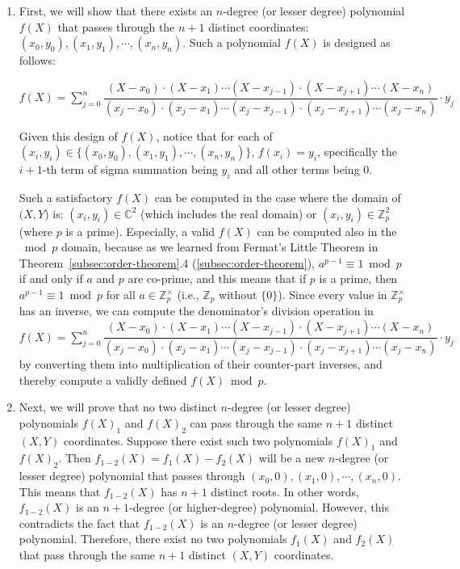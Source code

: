 \begin{myproof}
\begin{enumerate}


\item First, we will show that there exists an $n$-degree (or lesser degree) polynomial $f(X)$ that passes through the $n+1$ distinct coordinates: $(x_0, y_0), (x_1, y_1), \cdots, (x_n, y_n)$. Such a polynomial $f(X)$ is designed as follows:

$f(X) = \sum\limits_{j=0}^{n}\dfrac{(X-x_0)\cdot(X-x_1)\cdots(X-x_{j-1})\cdot(X-x_{j+1})\cdots(X-x_{n})}{(x_j-x_0)\cdot(x_j-x_1)\cdots(x_j-x_{j-1})\cdot(x_j-x_{j+1})\cdots(x_j-x_{n})}\cdot y_j$

Given this design of $f(X)$, notice that for each of $(x_i, y_i) \in \{(x_0, y_0), (x_1, y_1), \cdots, (x_n, y_n)\}$, \text{ } $f(x_i) = y_i$, specifically the $i+1$-th term of sigma summation being $y_i$ and all other terms being 0. 

Such a satisfactory $f(X)$ can be computed in the case where the domain of $(X, Y$) is: $(x_i, y_i) \in \mathbb{C}^2$ (which includes the real domain) or $(x_i, y_i) \in \mathbb{Z}_p^2$ (where $p$ is a prime). Especially, a valid $f(X)$ can be computed also in the $\bmod p$ domain, because as we learned from Fermat's Little Theorem in Theorem~\ref*{subsec:order-theorem}.4 (\autoref{subsec:order-theorem}), $a^{p - 1} \equiv 1 \bmod p$ if and only if $a$ and $p$ are co-prime, and this means that if $p$ is a prime, then $a^{p - 1} \equiv 1 \bmod p$ for all $a \in \mathbb{Z}_p^{\times}$ (i.e., $\mathbb{Z}_p$ without $\{0\}$). Since every value in $\mathbb{Z}_p^{\times}$ has an inverse, we can compute the denominator's division operation in $f(X) = \sum\limits_{j=0}^{n}\dfrac{(X-x_0)\cdot(X-x_1)\cdots(X-x_{j-1})\cdot(X-x_{j+1})\cdots(X-x_{n})}{(x_j-x_0)\cdot(x_j-x_1)\cdots(x_j-x_{j-1})\cdot(x_j-x_{j+1})\cdots(x_j-x_{n})}\cdot y_j$ by converting them into multiplication of their counter-part inverses, and thereby compute a validly defined $f(X) \bmod p$.
 
\item Next, we will prove that no two distinct $n$-degree (or lesser degree) polynomials $f(X)_1$ and $f(X)_2$ can pass through the same $n+1$ distinct $(X, Y)$ coordinates. Suppose there exist such two polynomials $f(X)_1$ and $f(X)_2$. Then $f_{1-2}(X) = f_1(X) - f_2(X)$ will be a new $n$-degree (or lesser degree) polynomial that passes through $(x_0, 0), (x_1, 0), \cdots, (x_n, 0)$. This means that $f_{1-2}(X)$ has $n+1$ distinct roots. In other words, $f_{1-2}(X)$ is an $n+1$-degree (or higher-degree) polynomial. However, this contradicts the fact that $f_{1-2}(X)$ is an $n$-degree (or lesser degree) polynomial. Therefore, there exist no two polynomials $f_1(X)$ and $f_2(X)$ that pass through the same $n+1$ distinct $(X, Y)$ coordinates. 


\end{enumerate}
\end{myproof}
